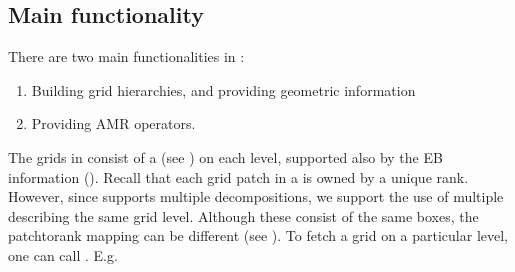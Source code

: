 \documentclass[letterpaper,10pt,english]{sphinxmanual}
\begin{document}
\subsection{Main functionality}
\label{\detokenize{Source/AmrMesh:main-functionality}}
There are two main functionalities in :
\begin{enumerate}
%
\item {} 
Building grid hierarchies, and providing geometric information

\item {} 
Providing AMR operators.

\end{enumerate}

The grids in  consist of a  (see {\hyperref[\detokenize{Source/ChomboBasics:chap-basics}]{}}) on each level, supported also by the EB information ().
Recall that each grid patch in a  is owned by a unique rank.
However, since  supports multiple decompositions, we support the use of multiple  describing the same grid level.
Although these  consist of the same boxes, the patch\sphinxhyphen{}to\sphinxhyphen{}rank mapping can be different (see {\hyperref[\detokenize{Source/Realm:chap-realm}]{}}).
To fetch a grid on a particular level, one can call .
E.g.

\begin{sphinxVerbatim}[commandchars=\\\{\},formatcom=\scriptsize]
  
  

    \PYG{p}{[}\PYG{p}{]}
\end{sphinxVerbatim}
\end{document}
